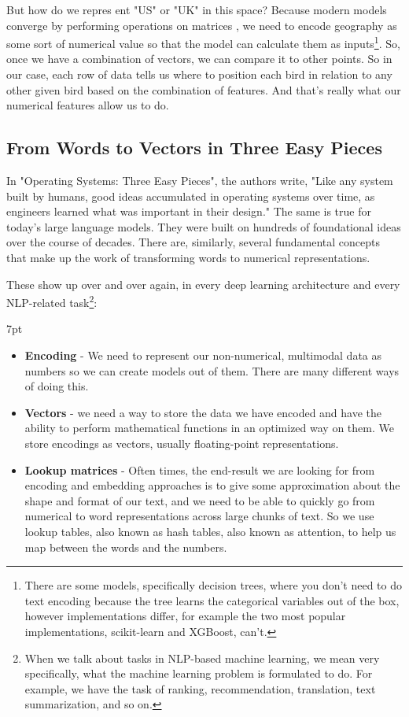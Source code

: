 \documentclass[11pt, table]{diazessay} %
\newenvironment{formal}{%
  \def\FrameCommand{%
	\hspace{1pt}%
	{\color{w_lightblue}\vrule width 2pt}%
	{\color{formalshade}\vrule width 4pt}%
	\colorbox{formalshade}%
  }%
  \MakeFramed{\advance\hsize-\width\FrameRestore}%
  \noindent\hspace{-4.55pt}%
  \begin{adjustwidth}{}{7pt}%
  \vspace{2pt}\vspace{2pt}%
}
{%
  \vspace{2pt}\end{adjustwidth}\endMakeFramed%
}
\begin{document}
\begin{sloppypar}
But how do we repres ent "US" or "UK" in this space? Because modern models converge by performing operations on matrices \citep{lakshmanan2020machine}, we need to encode geography as some sort of numerical value so that the model can calculate them as inputs\footnote{There are some models, specifically decision trees, where you don't need to do text encoding because the tree learns the categorical variables out of the box, however implementations differ, for example the two most popular implementations, scikit-learn and XGBoost\citep{altay_2020}, can't.}. So, once we have a combination of vectors, we can compare it to other points. So in our case, each row of data tells us where to position each bird in relation to any other given bird based on the combination of features.  And that's really what our numerical features allow us to do.


\subsection{From Words to Vectors in Three Easy Pieces}
In "Operating Systems: Three Easy Pieces", the authors write, "Like any system built by humans, good ideas accumulated in operating systems over time, as engineers learned what was important in their design."\citep{arpaci2018operating} The same is true for today's large language models. They were built on hundreds of foundational ideas over the course of decades.  There are, similarly, several fundamental concepts that make up the work of transforming words to numerical representations.

These show up over and over again, in every deep learning architecture and every NLP-related task\footnote{When we talk about tasks in NLP-based machine learning, we mean very specifically, what the machine learning problem is formulated to do. For example, we have the task of ranking, recommendation, translation, text summarization, and so on.}:

\begin{formal}
\begin{itemize}
  \item \textbf{Encoding} - We need to represent our non-numerical, multimodal data as numbers so we can create models out of them. There are many different ways of doing this.
  \item \textbf{Vectors} - we need a way to store the data we have encoded and have the ability to perform mathematical functions in an optimized way on them. We store encodings as vectors, usually floating-point representations.
  \item \textbf{Lookup matrices} - Often times, the end-result we are looking for from encoding and embedding approaches is to give some approximation about the shape and format of our text, and we need to be able to quickly go from numerical to word representations across large chunks of text. So we use lookup tables, also known as hash tables, also known as attention, to help us map between the words and the numbers.
\end{itemize}
\end{formal}


\end{sloppypar}
\end{document}
